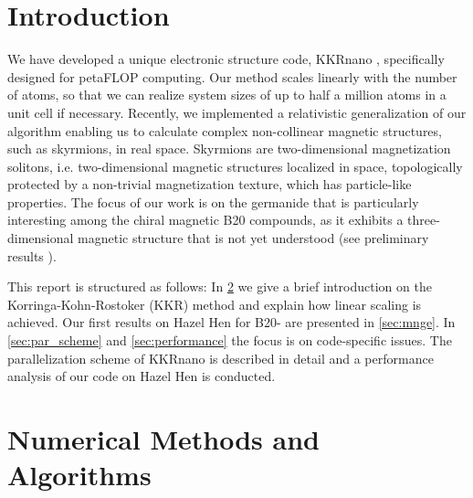\documentclass[graybox]{svmult}
\begin{document}
\section{Introduction}
\label{sec:intro}
We have developed a unique electronic structure code, 
KKRnano \cite{zeller_towards_2008,thiess_massively_2012},
specifically designed for petaFLOP computing. Our method scales linearly
with the number of atoms, so that we can realize system sizes of up to 
half a million atoms in a unit cell if necessary.
Recently, we implemented a relativistic generalization of our algorithm 
enabling us to calculate complex non-collinear magnetic structures, such as skyrmions,
in real space. Skyrmions are two-dimensional magnetization solitons, i.e. two-dimensional
magnetic structures localized in space, topologically protected by a non-trivial
magnetization texture, which has particle-like properties. 
The focus of our work is on the germanide  that is particularly
interesting among the chiral magnetic B20 compounds, as it exhibits a three-dimensional magnetic structure
that is not yet understood (see preliminary results
\cite{tanigaki_real-space_2015,rybakov_new_2016,bornemann_investigation_2017}).

This report is structured as follows:
In \cref{sec:methods_algorithms} we give a brief introduction on the Korringa-Kohn-Rostoker (KKR) 
method and explain how
linear scaling is achieved.
Our first results on Hazel Hen for B20- are presented in \cref{sec:mnge}.
In \cref{sec:par_scheme} and \cref{sec:performance} the focus is on code-specific issues. 
The parallelization scheme of KKRnano
is described in detail and a performance analysis of our code on Hazel Hen is conducted.


\section{Numerical Methods and Algorithms}
\label{sec:methods_algorithms}
 
\end{document}
